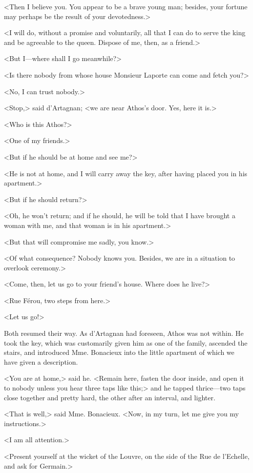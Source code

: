 <Then I believe you. You appear to be a brave young man; besides, your fortune may perhaps be the result of your devotedness.> 

<I will do, without a promise and voluntarily, all that I can do to serve the king and be agreeable to the queen. Dispose of me, then, as a friend.> 

<But I---where shall I go meanwhile?> 

<Is there nobody from whose house Monsieur Laporte can come and fetch you?> 

<No, I can trust nobody.> 

<Stop,> said d'Artagnan; <we are near Athos's door. Yes, here it is.> 

<Who is this Athos?> 

<One of my friends.> 

<But if he should be at home and see me?> 

<He is not at home, and I will carry away the key, after having placed you in his apartment.> 

<But if he should return?> 

<Oh, he won't return; and if he should, he will be told that I have brought a woman with me, and that woman is in his apartment.> 

<But that will compromise me sadly, you know.> 

<Of what consequence? Nobody knows you. Besides, we are in a situation to overlook ceremony.> 

<Come, then, let us go to your friend's house. Where does he live?> 

<Rue Férou, two steps from here.> 

<Let us go!> 

Both resumed their way. As d'Artagnan had foreseen, Athos was not within. He took the key, which was customarily given him as one of the family, ascended the stairs, and introduced Mme. Bonacieux into the little apartment of which we have given a description. 

<You are at home,> said he. <Remain here, fasten the door inside, and open it to nobody unless you hear three taps like this;> and he tapped thrice---two taps close together and pretty hard, the other after an interval, and lighter. 

<That is well,> said Mme. Bonacieux. <Now, in my turn, let me give you my instructions.> 

<I am all attention.> 

<Present yourself at the wicket of the Louvre, on the side of the Rue de l'Echelle, and ask for Germain.> 

